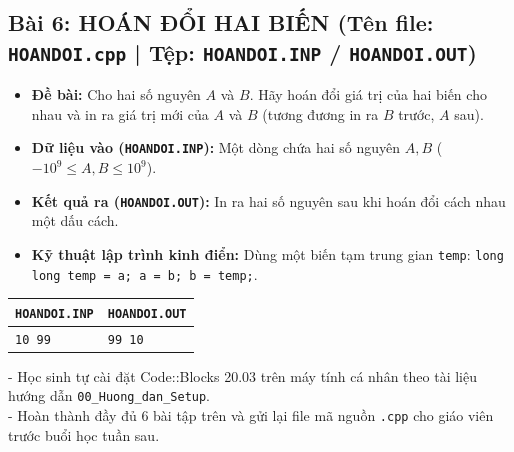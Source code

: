 \documentclass[11pt,a4paper]{article}
\begin{document}
\subsection*{\color{AsianDarkBlue}\small Bài 6: HOÁN ĐỔI HAI BIẾN (Tên file: \texttt{HOANDOI.cpp} | Tệp: \texttt{HOANDOI.INP} / \texttt{HOANDOI.OUT})}
\begin{itemize}
    \setlength{\itemsep}{0.5pt}
    \footnotesize
    \item \textbf{Đề bài:} Cho hai số nguyên $A$ và $B$. Hãy hoán đổi giá trị của hai biến cho nhau và in ra giá trị mới của $A$ và $B$ (tương đương in ra $B$ trước, $A$ sau).
    \item \textbf{Dữ liệu vào (\texttt{HOANDOI.INP}):} Một dòng chứa hai số nguyên $A, B$ ($-10^9 \le A, B \le 10^9$).
    \item \textbf{Kết quả ra (\texttt{HOANDOI.OUT}):} In ra hai số nguyên sau khi hoán đổi cách nhau một dấu cách.
    \item \textbf{Kỹ thuật lập trình kinh điển:} Dùng một biến tạm trung gian \texttt{temp}:
    \texttt{long long temp = a; a = b; b = temp;}.
\end{itemize}
\vspace{-2mm}
\begin{center}
\footnotesize
\begin{tabular}{|p{7.8cm}|p{7.8cm}|}
\hline
\textbf{\texttt{HOANDOI.INP}} & \textbf{\texttt{HOANDOI.OUT}} \\
\hline
\texttt{10 99} & \texttt{99 10} \\
\hline
\end{tabular}
\end{center}

\vspace{-1mm}
\begin{tcolorbox}[colback=AsianBlue!5!white,colframe=AsianDarkBlue,arc=1mm,title=\textbf{\footnotesize LỜI NHẮC HỌC TẬP VỀ NHÀ}]
\footnotesize
- Học sinh tự cài đặt Code::Blocks 20.03 trên máy tính cá nhân theo tài liệu hướng dẫn \texttt{00\_Huong\_dan\_Setup}.\\
- Hoàn thành đầy đủ 6 bài tập trên và gửi lại file mã nguồn \texttt{.cpp} cho giáo viên trước buổi học tuần sau.
\end{tcolorbox}
\end{document}
